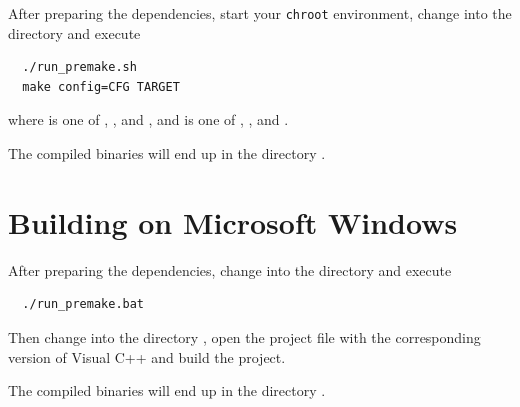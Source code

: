 After preparing the dependencies, start your \texttt{chroot}
environment, change into the directory  and execute

\begin{verbatim}
  ./run_premake.sh
  make config=CFG TARGET
\end{verbatim}

where  is one of ,
,  and
, and  is one of
,
,
 and
.

The compiled binaries will end up in the directory .

\section{Building on Microsoft Windows}

After preparing the dependencies, change into the directory
 and execute

\begin{verbatim}
  ./run_premake.bat
\end{verbatim}

Then change into the directory , open the
project file with the corresponding version of Visual C++ and build
the project.

The compiled binaries will end up in the directory .






